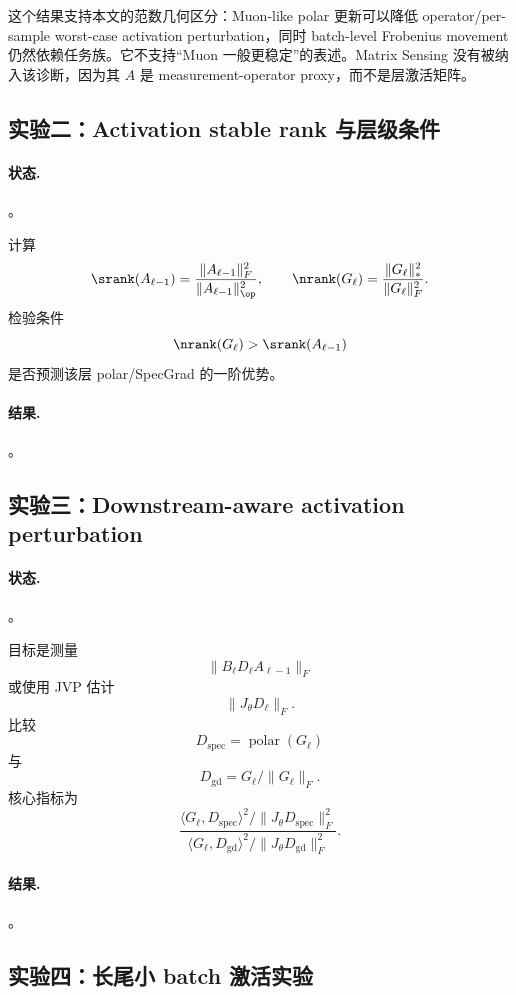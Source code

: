 

这个结果支持本文的范数几何区分：Muon-like polar 更新可以降低 operator/per-sample worst-case activation perturbation，同时 batch-level Frobenius movement 仍然依赖任务族。它不支持“Muon 一般更稳定”的表述。Matrix Sensing 没有被纳入该诊断，因为其 \(A\) 是 measurement-operator proxy，而不是层激活矩阵。

\subsection{实验二：Activation stable rank 与层级条件}

\paragraph{状态.} \TBD。

计算
\[
\srank(A_{\ell-1})=\frac{\|A_{\ell-1}\|_F^2}{\|A_{\ell-1}\|_{\op}^2},
\qquad
\nrank(G_\ell)=\frac{\|G_\ell\|_*^2}{\|G_\ell\|_F^2}.
\]
检验条件
\[
\nrank(G_\ell)>\srank(A_{\ell-1})
\]
是否预测该层 polar/SpecGrad 的一阶优势。

\paragraph{结果.} \TBD。

\subsection{实验三：Downstream-aware activation perturbation}

\paragraph{状态.} \TBD。

目标是测量
\[
\|B_\ell D_\ell A_{\ell-1}\|_F
\]
或使用 JVP 估计
\[
\|J_\theta D_\ell\|_F.
\]
比较
\[
D_{\mathrm{spec}}=\operatorname{polar}(G_\ell)
\]
与
\[
D_{\mathrm{gd}}=G_\ell/\|G_\ell\|_F.
\]
核心指标为
\[
\frac{\langle G_\ell,D_{\mathrm{spec}}\rangle^2/\|J_\theta D_{\mathrm{spec}}\|_F^2}
{\langle G_\ell,D_{\mathrm{gd}}\rangle^2/\|J_\theta D_{\mathrm{gd}}\|_F^2}.
\]

\paragraph{结果.} \TBD。

\subsection{实验四：长尾小 batch 激活实验}

